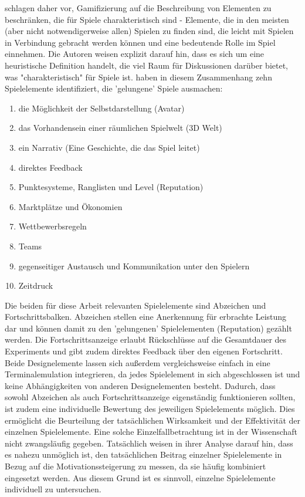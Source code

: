 schlagen daher vor, Gamifizierung auf die Beschreibung von Elementen zu beschränken, die für Spiele charakteristisch sind - Elemente, die in den meisten (aber nicht notwendigerweise allen) Spielen zu finden sind, die leicht mit Spielen in Verbindung gebracht werden können und eine bedeutende Rolle im Spiel einnehmen. Die Autoren weisen explizit darauf hin, dass es sich um eine heuristische Definition handelt, die viel Raum für Diskussionen darüber bietet, was "charakteristisch" für Spiele ist.  haben in diesem Zusammenhang zehn Spielelemente identifiziert, die 'gelungene' Spiele ausmachen:

\begin{enumerate}
  \item die Möglichkeit der Selbstdarstellung (Avatar)
  \item das Vorhandensein einer räumlichen Spielwelt (3D Welt)
  \item ein Narrativ (Eine Geschichte, die das Spiel leitet)
  \item direktes Feedback
  \item Punktesysteme, Ranglisten und Level (Reputation)
  \item Marktplätze und Ökonomien
  \item Wettbewerbsregeln 
  \item Teams
  \item gegenseitiger Austausch und Kommunikation unter den Spielern
  \item Zeitdruck
\end{enumerate}

Die beiden für diese Arbeit relevanten Spielelemente sind Abzeichen und Fortschrittsbalken. Abzeichen stellen eine Anerkennung für erbrachte Leistung dar und können damit zu den 'gelungenen' Spielelementen (Reputation) gezählt werden. Die Fortschrittsanzeige erlaubt Rückschlüsse auf die Gesamtdauer des Experiments und gibt zudem direktes Feedback über den eigenen Fortschritt. Beide Designelemente lassen sich außerdem vergleichsweise einfach in eine Terminalemulation integrieren, da jedes Spielelement in sich abgeschlossen ist und keine Abhängigkeiten von anderen Designelementen besteht. Dadurch, dass sowohl Abzeichen als auch Fortschrittsanzeige eigenständig funktionieren sollten, ist zudem eine individuelle Bewertung des jeweiligen Spielelements möglich. Dies ermöglicht die Beurteilung der tatsächlichen Wirksamkeit und der Effektivität der einzelnen Spielelemente. Eine solche Einzelfallbetrachtung ist in der Wissenschaft nicht zwangsläufig gegeben. Tatsächlich weisen  in ihrer Analyse darauf hin, dass es nahezu unmöglich ist, den tatsächlichen Beitrag einzelner Spielelemente in Bezug auf die Motivationssteigerung zu messen, da sie häufig kombiniert eingesetzt werden. Aus diesem Grund ist es sinnvoll, einzelne Spielelemente individuell zu untersuchen.


